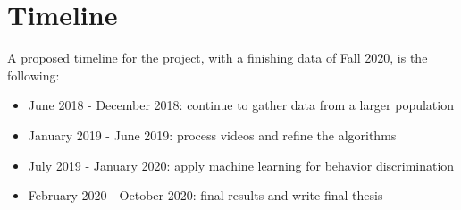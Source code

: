 \documentclass[11pt]{article}
\begin{document}
\section{Timeline}
A proposed timeline for the project, with a finishing data of Fall 2020, is the following:
\begin{itemize}
  \item June 2018 - December 2018: continue to gather data from a larger population
  \item January 2019 - June 2019: process videos and refine the algorithms
  \item July 2019 - January 2020: apply machine learning for behavior discrimination
  \item February 2020 - October 2020: final results and write final thesis
\end{itemize}

\pagebreak
%

\end{document}
